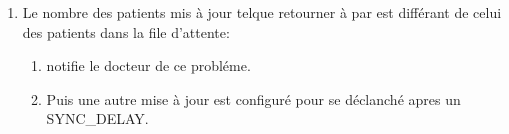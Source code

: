 \begin{enumerate}[label=\ref{enu:equalpatients}.\alph*]

\item Le nombre des patients mis à jour telque retourner à par  est différant de celui des patients dans la file d'attente:\label{enu:alt_equalSpatients}

\begin{enumerate}[label=\ref{enu:alt_equalSpatients}.\arabic*]

\item {} notifie le docteur de ce probléme.

\item Puis une autre mise à jour est configuré pour se déclanché apres un SYNC\_DELAY.

\end{enumerate}

\end{enumerate}